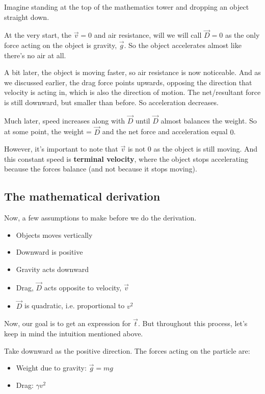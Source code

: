 Imagine standing at the top of the mathematics tower and dropping an object straight down.

At the very start, the $\vec{v} =0$ and air resistance, will we will call $\vec{D} = 0$ as the only force acting on the object is gravity, $\vec{g}$. So the object accelerates almost like there's no air at all. 

A bit later, the object is moving faster, so air resistance is now noticeable. And as we discussed earlier, the drag force points upwards, opposing the direction that velocity is acting in, which is also the direction of motion. The net/resultant force is still downward, but smaller than before. So acceleration decreases. 

Much later, speed increases along with $\vec{D}$ until $\vec{D}$ almost balances the weight. So at some point, the weight = $\vec{D}$ and the net force and acceleration equal $0$. 

However, it's important to note that $\vec{v}$ is not $0$ as the object is still moving. And this constant speed is \textbf{terminal velocity}, where the object stops accelerating because the forces balance (and not because it stops moving). 


\subsection{The mathematical derivation}

Now, a few assumptions to make before we do the derivation. 
\begin{itemize}
    \item Objects moves vertically 
    \item Downward is positive 
    \item Gravity acts downward 
    \item Drag, $\vec{D}$ acts opposite to velocity, $\vec{v}$
    \item $\vec{D}$ is quadratic, i.e. proportional to $v^2$
\end{itemize}

Now, our goal is to get an expression for $\vec{t}$. But throughout this process, let's keep in mind the intuition mentioned above. 



Take downward as the positive direction. The forces acting on the particle are:

\begin{itemize}
  \item Weight due to gravity: $ \vec{g} = mg$ 
  \item Drag: $\gamma v^2$ 
\end{itemize}

